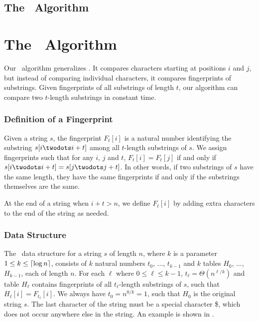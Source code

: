 \documentclass[a4]{article}
\newcommand*{\pref}{\prettyref}
\begin{document}
\subsection{The \fprintk\ Algorithm}

\fi %

\ifarticle
\section{The \fprintk\ Algorithm}
\fi %

Our \fprintk\ algorithm generalizes . It compares characters starting at positions $i$ and $j$, but instead of comparing individual characters, it compares fingerprints of substrings. Given fingerprints of all substrings of length $t$, our algorithm can compare two $t$-length substrings in constant time.

\subsubsection{Definition of a Fingerprint}

Given a string $s$, the fingerprint $F_t[i]$ is a natural number identifying the substring $s[i\twodots i+t]$ among all $t$-length substrings of $s$. We assign fingerprints such that for any $i$, $j$ and $t$, $F_t[i] = F_t[j]$ if and only if $s[i\twodots i+t] = s[j\twodots j+t]$. In other words, if two substrings of $s$ have the same length, they have the same fingerprints if and only if the substrings themselves are the same.

At the end of a string when $i+t>n$, we define $F_t[i]$ by adding extra characters to the end of the string as needed.

\subsubsection{Data Structure\label{sec:fingerprint-ds}}

The \fprintk\ data structure for a string $s$ of length $n$, where $k$ is a parameter $1 \leq k \leq \lceil\log n\rceil$, consists of $k$ natural numbers $t_0$, ..., $t_{k-1}$ and $k$ tables $H_0$, ..., $H_{k-1}$, each of length $n$. For each $\ell$ where $0\leq \ell\leq k-1$, $t_\ell = \Theta(n^{\ell/k})$ and table $H_\ell$ contains fingerprints of all $t_\ell$-length substrings of $s$, such that $H_\ell[i] = F_{t_\ell}[i]$. We always have $t_0 = n^{0/k} = 1$, such that $H_0$ is the original string $s$. The last character of the string must be a special character \$, which does not occur anywhere else in the string. An example is shown in \pref{fig:fingerprint-ds}.
\end{document}
